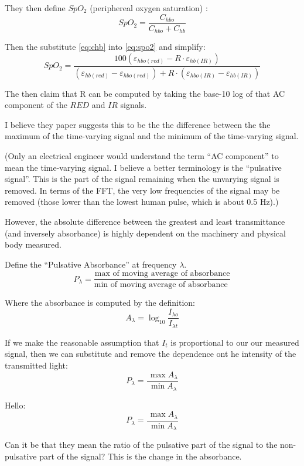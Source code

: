 \documentclass[11pt]{article}
\renewcommand{\min}{\expandafter\,\operatorname*{min}}
\renewcommand{\max}{\expandafter\,\operatorname*{max}}
\begin{document}
They then define $SpO_2$ (periphereal oxygen saturation)
\cite{wiki:SpO2,wiki:oxygensaturation}:
\begin{equation}
  \label{eq:spo2}
  SpO_2 = \frac{C_{hbo}}{C_{hbo} + C_{hb}}
\end{equation}

Then the substitute \ref{eq:chb} into \ref{eq:spo2} and simplify:
\begin{equation}
  SpO_2 = \frac{100 (\varepsilon_{hbo(red)} - R \cdot \varepsilon_{hb(IR)})}
  {(\varepsilon_{hb(red)} - \varepsilon_{hbo(red)}) + R \cdot(\varepsilon_{hbo(IR)} - \varepsilon_{hb(IR)})}
\end{equation}

The then claim that R can be computed by taking the base-10 log of that AC 
component of the $RED$ and $IR$ signals.

I believe they paper suggests this to be the the difference between the the maximum
of the time-varying signal and the minimum of the time-varying signal.

(Only an electrical engineer would understand the term ``AC component'' to
mean the time-varying signal. I believe a better terminology is the
``pulsative signal''. This is the part of the signal remaining when the
unvarying signal is removed. In terms of the FFT, the very low frequencies
of the signal may be removed (those lower than the lowest human pulse, which
is about 0.5 Hz).)

However, the absolute difference between the greatest and least
transmittance (and inversely absorbance) is highly dependent on the
machinery and physical body measured.

Define the ``Pulsative Absorbance'' at frequency $\lambda$. 
\begin{equation}
  P_{\lambda} = \frac{\text{max of moving average of absorbance}}
  {\text{min of moving average of absorbance }}
\end{equation}

Where the absorbance is computed by the definition:
\begin{equation}
 A_{\lambda} = \log_{10} \frac{I_{\lambda o}}{I_{\lambda t}}   
\end{equation}

If we make the reasonable assumption that $I_t$ is proportional
to our our measured signal, then we can substitute and
remove the dependence ont he intensity of the transmitted light:
\begin{equation}
  P_{\lambda} = \frac{\max{A_{\lambda}}}
  {\min{A_{\lambda}}}
\end{equation}

Hello: 
\begin{equation}
  P_{\lambda} = \frac{\max{A_{\lambda}}}
  {\min{A_{\lambda}}}
\end{equation}




Can it be that they mean the ratio of the pulsative part of the signal
to the non-pulsative part of the signal?  This is the change in
the absorbance.










\end{document}
